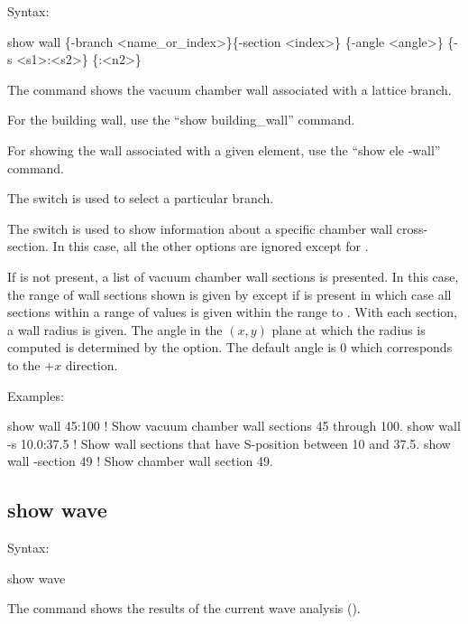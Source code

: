 {{{{{{Syntax:
\begin{example}
  show wall \{-branch <name_or_index>\}\{-section <index>\} \{-angle <angle>\}
  \{-s <s1>:<s2>\} \{<n1>:<n2>\}
\end{example}

The  command shows the vacuum chamber wall associated with a lattice branch.

For the building wall, use the ``show building_wall'' command.

For showing the wall associated with a given element, use the ``show ele -wall'' command.

The  switch is used to select a particular branch.

The  switch is used to show information about a specific chamber wall
cross-section. In this case, all the other options are ignored except for .

If  is not present, a list of vacuum chamber wall sections is presented. In
this case, the range of wall sections shown is given by  except if 
is present in which case all sections within a range of  values is given within the
range  to . With each section, a wall radius is given. The angle in the
$(x,y)$ plane at which the radius is computed is determined by the  option. The
default angle is 0 which corresponds to the $+x$ direction.

Examples:
\begin{example}
  show wall 45:100       ! Show vacuum chamber wall sections 45 through 100.
  show wall -s 10.0:37.5 ! Show wall sections that have S-position between 10 and 37.5.
  show wall -section 49  ! Show chamber wall section 49.
\end{example}


\subsection{show wave}
\label{s:show.wave}

Syntax:
\begin{example}
  show wave
\end{example}

The  command shows the results of the current wave analysis ().

}}}}}}
